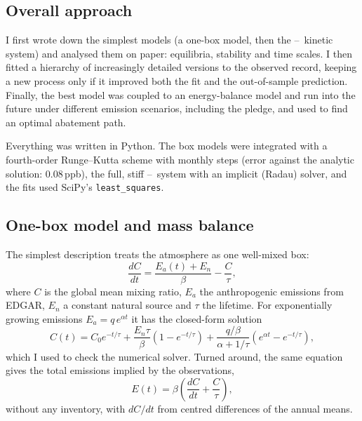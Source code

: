 \documentclass[11pt,a4paper]{article}
\newcommand{\CH}{\ce{CH4}}
\newcommand{\OH}{\ce{OH}}
\begin{document}
\subsection{Overall approach}
I first wrote down the simplest models (a one-box model, then the \CH--\OH\ kinetic system) and analysed them on paper: equilibria, stability and time scales. I then fitted a hierarchy of increasingly detailed versions to the observed record, keeping a new process only if it improved both the fit and the out-of-sample prediction. Finally, the best model was coupled to an energy-balance model and run into the future under different emission scenarios, including the pledge, and used to find an optimal abatement path.

Everything was written in Python. The box models were integrated with a fourth-order Runge--Kutta scheme with monthly steps (error against the analytic solution: 0.08\,ppb), the full, stiff \CH--\OH\ system with an implicit (Radau) solver, and the fits used SciPy's \texttt{least\_squares}.

\subsection{One-box model and mass balance}
The simplest description treats the atmosphere as one well-mixed box:
\begin{equation}
\frac{dC}{dt}=\frac{E_a(t)+E_n}{\beta}-\frac{C}{\tau},
\label{eq:onebox}
\end{equation}
where $C$ is the global mean mixing ratio, $E_a$ the anthropogenic emissions from EDGAR, $E_n$ a constant natural source and $\tau$ the lifetime. For exponentially growing emissions $E_a=q\,e^{\alpha t}$ it has the closed-form solution
\begin{equation}
C(t)=C_0e^{-t/\tau}+\frac{E_n\tau}{\beta}\left(1-e^{-t/\tau}\right)+\frac{q/\beta}{\alpha+1/\tau}\left(e^{\alpha t}-e^{-t/\tau}\right),
\end{equation}
which I used to check the numerical solver. Turned around, the same equation gives the total emissions implied by the observations,
\begin{equation}
E(t)=\beta\left(\frac{dC}{dt}+\frac{C}{\tau}\right),
\label{eq:topdown}
\end{equation}
without any inventory, with $dC/dt$ from centred differences of the annual means.
\end{document}
